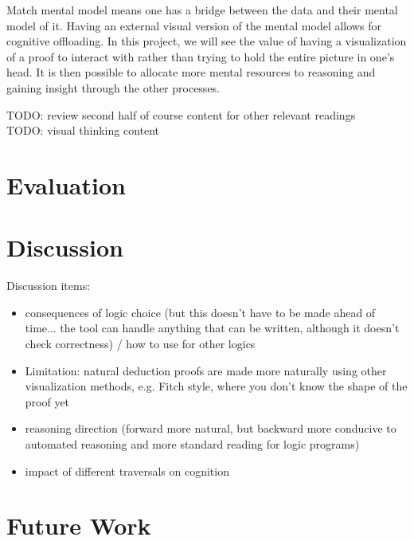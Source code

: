 \documentclass[conference]{IEEEtran}
\begin{document}
Match mental model means one has a bridge between the data and their mental model of it. Having an external visual version of the mental model allows for cognitive offloading. In this project, we will see the value of having a visualization of a proof to interact with rather than trying to hold the entire picture in one’s head. It is then possible to allocate more mental resources to reasoning and gaining insight through the other processes.

TODO: review second half of course content for other relevant readings \\

TODO: visual thinking content \\

\section{Evaluation}
\label{sec:evaluation}



\section{Discussion}
\label{sec:discussion}

Discussion items:

\begin{itemize}
    \item consequences of logic choice (but this doesn't have to be made ahead of time... the tool can handle anything that can be written, although it doesn't check correctness) / how to use for other logics
    \item Limitation: natural deduction proofs are made more naturally using other visualization methods, e.g. Fitch style, where you don't know the shape of the proof yet
    \item reasoning direction (forward more natural, but backward more conducive to automated reasoning and more standard reading for logic programs)
    \item impact of different traversals on cognition
\end{itemize}

\section{Future Work}
\label{sec:future}
\end{document}
